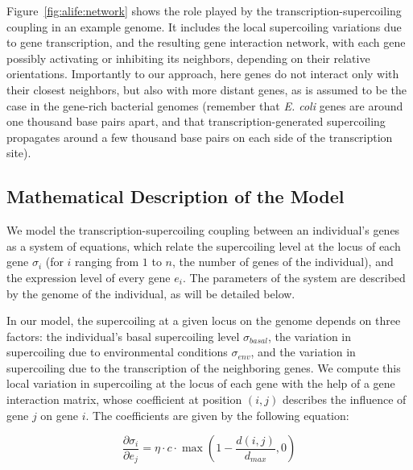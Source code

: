 Figure~\ref{fig:alife:network} shows the role played by the transcription-supercoiling coupling in an example genome.
It includes the local supercoiling variations due to gene transcription, and the resulting gene interaction network, with each gene possibly activating or inhibiting its neighbors, depending on their relative orientations.
Importantly to our approach, here genes do not interact only with their closest neighbors, but also with more distant genes, as is assumed to be the case in the gene-rich bacterial genomes (remember that \emph{E. coli} genes are around one thousand base pairs apart, and that transcription-generated supercoiling propagates around a few thousand base pairs on each side of the transcription site).


\subsection{Mathematical Description of the Model}

We model the transcription-supercoiling coupling between an individual's genes as a system of equations, which relate the supercoiling level at the locus of each gene $\sigma_i$ (for $i$ ranging from $1$ to $n$, the number of genes of the individual), and the expression level of every gene $e_i$.
The parameters of the system are described by the genome of the individual, as will be detailed below.

In our model, the supercoiling at a given locus on the genome depends on three factors: the individual's basal supercoiling level $\sigma_{basal}$, the variation in supercoiling due to environmental conditions $\sigma_{env}$, and the variation in supercoiling due to the transcription of the neighboring genes.
We compute this local variation in supercoiling at the locus of each gene with the help of a gene interaction matrix, whose coefficient at position $(i, j)$ describes the influence of gene $j$ on gene $i$.
The coefficients are given by the following equation:

\begin{equation}
\frac{\partial\sigma_{i}}{\partial e_j} = \eta\cdot c \cdot\max(1-\frac{d(i, j)}{d_{max}}, 0)
\label{eq:dsde}
\end{equation}

